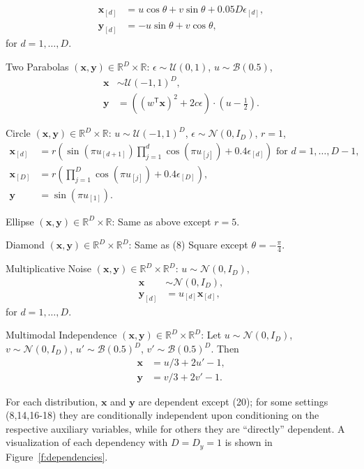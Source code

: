 \documentclass[11pt]{article}
\providecommand{\mb}[1]{\boldsymbol{#1}}
\providecommand{\mc}[1]{\mathcal{#1}}
\newcommand{\Real}{\mathbb{R}}
\newcommand{\T}{^{\ensuremath{\mathsf{T}}}}           %
\newcommand{\mby}{\ensuremath{\mb{y}}}
\begin{document}
\begin{compactenum}
\begin{align*}
\mb{x}_{[d]}&=u \cos\theta + v \sin\theta + 0.05 D\epsilon_{[d]},\\
\mb{y}_{[d]}&=-u \sin\theta + v \cos\theta,
\end{align*}
for $d=1,\ldots,D$.
\item Two Parabolas $(\mb{x},\mb{y}) \in \Real^{D} \times \Real$: $\epsilon \sim \mc{U}(0,1)$, $u \sim \mc{B}(0.5)$,
\begin{align*}
\mb{x} &\sim \mc{U}(-1,1)^{D},\\
\mb{y}&=\left( (w\T \mb{x})^2  + 2c\epsilon\right) \cdot (u-\tfrac{1}{2}).
\end{align*}
\item Circle $(\mb{x},\mb{y}) \in \Real^{D} \times \Real$: $u \sim \mc{U}(-1,1)^{D}$, $\epsilon \sim \mc{N}(0, I_{D})$, $r=1$,
\begin{align*}
\mb{x}_{[d]}&=r \left(\sin(\pi u_{[d+1]})  \prod_{j=1}^{d} \cos(\pi u_{[j]})+0.4 \epsilon_{[d]}\right) \mbox{ for $d=1,\ldots,D-1$},\\
\mb{x}_{[D]}&=r \left(\prod_{j=1}^{D} \cos(\pi u_{[j]})+0.4 \epsilon_{[D]}\right),\\
\mb{y}&= \sin(\pi u_{[1]}).
\end{align*}
\item Ellipse $(\mb{x},\mb{y}) \in \Real^{D} \times \Real$: Same as above except $r=5$.
\item Diamond $(\mb{x},\mb{y}) \in \Real^{D} \times \Real^{D}$: Same as (8) Square except $\theta=-\frac{\pi}{4}$.
\item Multiplicative Noise $(\mb{x},\mb{y}) \in \Real^{D} \times \Real^{D}$: $u \sim \mc{N}(0, I_{D})$, 
\begin{align*}
\mb{x} &\sim \mc{N}(0, I_{D}),\\
\mb{y}_{[d]}&=u_{[d]}\mb{x}_{[d]},
\end{align*}
for $d=1,\ldots,D$.
\item Multimodal Independence $(\mb{x},\mb{y}) \in \Real^{D} \times \Real^{D}$: Let $u \sim \mc{N}(0,I_{D})$, $v \sim \mc{N}(0,I_{D})$, $u' \sim \mc{B}(0.5)^{D}$, $v' \sim \mc{B}(0.5)^{D}$. Then
\begin{align*}
\mb{x}&=u/3+2u'-1,\\
\mb{y}&=v/3+2v'-1.
\end{align*}
\end{compactenum}

For each distribution, $\mb{x}$ and $\mb{y}$ are dependent except  (20); for some settings (8,14,16-18) they are conditionally independent upon conditioning on the respective auxiliary variables, while for others they are
 ``directly'' dependent. 
A visualization of each dependency with $D=D_y=1$ is shown in Figure~\ref{f:dependencies}.
\end{document}
